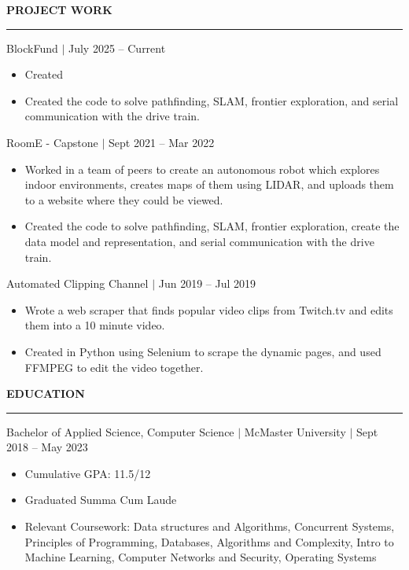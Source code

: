 \documentclass[12pt]{article}
\newcommand{\sectionRule}{\textcolor{gray}{\rule{7.27in}{0.02cm}}}
\newcommand{\sectionTxt}[1]{\noindent\textbf{#1}\\}
\newcommand{\textDate}[3]{\noindent#1 $|$ #2 $|$ {\color{textGray} #3}}
\newcommand{\projText}[2]{\noindent#1 $|$ {\color{textGray} #2}}
\begin{document}
    \newpage

    \sectionTxt{PROJECT WORK}
    \sectionRule
    
    \projText{BlockFund}{July 2025 -- Current}
    \begin{small}
        \begin{itemize}
            \itemsep0em 
            \item {Created }
            \item {Created the code to solve pathfinding, SLAM, frontier exploration, and serial communication with the drive train. }
        \end{itemize}
    \end{small}

    \projText{RoomE - Capstone}{Sept 2021 -- Mar 2022}
    \begin{small}
        \begin{itemize}
            \itemsep0em 
            \item {Worked in a team of peers to create an autonomous robot which explores indoor environments, creates maps of them using LIDAR, and uploads them to a website where they could be viewed.}
            \item {Created the code to solve pathfinding, SLAM, frontier exploration, create the data model and representation, and serial communication with the drive train. }
        \end{itemize}
    \end{small}

    \projText{Automated Clipping Channel}{Jun 2019 -- Jul 2019}
    \begin{small}
        \begin{itemize}
            \itemsep0em
            \item {\color{textGray} Wrote a web scraper that finds popular video clips from Twitch.tv and edits them into a 10 minute video.}
            \item {\color{textGray} Created in Python using Selenium to scrape the dynamic pages, and used FFMPEG to edit the video together.}
        \end{itemize}
    \end{small}

    \sectionTxt{EDUCATION}
    \sectionRule

    \textDate{Bachelor of Applied Science, Computer Science}{McMaster University}{Sept 2018 -- May 2023}
    \begin{small}
        \begin{itemize}
            \itemsep0em 
            \item Cumulative GPA: {11.5/12}
            \item Graduated Summa Cum Laude
            \item Relevant Coursework: {Data structures and Algorithms, Concurrent Systems, Principles of Programming, Databases, Algorithms and Complexity, Intro to Machine Learning, Computer Networks and Security, Operating Systems}
        \end{itemize}
    \end{small}
\end{document}
